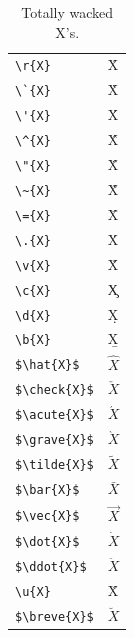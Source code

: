 ﻿\documentclass{article}
\begin{document}
\begin{table}
\pagebreak
\begin{center}
\begin{tabular}{ll}
\verb#\r{X}#& \r{X}\\
\verb#\`{X}#& \`{X}\\
\verb#\'{X}#& \'{X}\\
\verb#\^{X}#& \^{X}\\
\verb#\"{X}#& \"{X}\\
\verb#\~{X}#& \~{X}\\
\verb#\={X}#& \={X}\\
\verb#\.{X}#& \.{X}\\
\verb#\v{X}#& \v{X}\\
\verb#\c{X}#& \c{X}\\
\verb#\d{X}#& \d{X}\\
\verb#\b{X}#& \b{X}\\
\verb#$\hat{X}$#& $\hat{X}$\\
\verb#$\check{X}$#& $\check{X}$\\
\verb#$\acute{X}$#& $\acute{X}$\\
\verb#$\grave{X}$#& $\grave{X}$\\
\verb#$\tilde{X}$#& $\tilde{X}$\\
\verb#$\bar{X}$#& $\bar{X}$\\
\verb#$\vec{X}$#& $\vec{X}$\\
\verb#$\dot{X}$#& $\dot{X}$\\
\verb#$\ddot{X}$#& $\ddot{X}$\\
\verb#\u{X}#& \u{X}\\
\verb#$\breve{X}$#& $\breve{X}$
\end{tabular}
\caption{Totally wacked X's.}
\end{center}
\end{table}
\pagebreak
\end{document}
